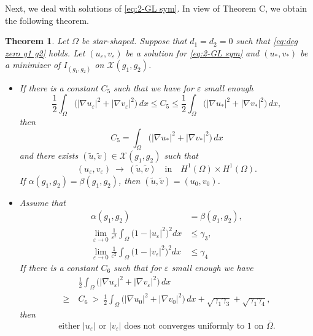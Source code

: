 \documentclass[a4paper,10pt,reqno]{amsart}
\newtheorem{theorem}{Theorem}[section]
\theoremstyle{definition}
\newcommand{\calX}{{\mathcal X}}
\newcommand{\tilu}{{\widetilde u}}
\newcommand{\tilv}{{\widetilde v}}
\newcommand{\al}{{\alpha}}
\newcommand{\ga}{{\gamma}}
\newcommand{\ve}{{\varepsilon}}
\newcommand{\Om}{{\Omega}}
\newcommand{\qin}{{\quad \mbox{in} \quad}}
\numberwithin{equation}{section}
\begin{document}
Next, we deal with solutions of \eqref{eq:2-GL sym}.
In view of Theorem C, we obtain the following theorem.

\smallskip
\begin{theorem}\label{thm:main4}
Let $\Om$ be star-shaped.
Suppose that $d_1=d_2=0$ such that  \eqref{eq:deg zero g1 g2} holds.
Let  $(u_\ve,v_\ve)$ be a solution for \eqref{eq:2-GL sym} and $(u_*,v_*)$ be a   minimizer of $I_{(g_1,g_2)}$ on $\calX(g_1,g_2)$.
\begin {itemize}
\item[{\rm (i)}]
If  there is a constant $C_5$  such that  we have for $\ve$ small enough
\begin{equation}\label{G < C_1-sys-sym}
\frac{1}{2} \int_\Omega \big( |\nabla u_\ve|^2 + |\nabla v_\ve|^2 \big)\, dx \leq C_5 \leq
\frac{1}{2} \int_\Omega \big( |\nabla u_*|^2 + |\nabla v_*|^2 \big)\, dx ,
\end{equation}
then
\begin{equation}\label{eq:C1-1-sys-sym}
C_5 = \int_\Omega \big( |\nabla u_*|^2 + |\nabla v_*|^2 \big)\, dx
\end{equation}
and there exists  $( \tilu ,\tilv)   \in \calX(g_1,g_2)$ such that
\[  (u_\ve,v_\ve)  ~\to ~  ( \tilu ,\tilv) \qin H^1(\Om)\times H^1(\Om).
\]
If $\al(g_1,g_2)=\beta(g_1,g_2)$, then $(\tilu,\tilv)=(u_0,v_0)$.


\item[{\rm (ii)}]
Assume that
\begin{align}
\label{eq:al=beta}
 \al(g_1,g_2)& =\beta(g_1,g_2) ,\\
\label{eq:gamma3}
 \lim_{\ve \to 0} \frac{1}{\ve^2} \int_\Om \big(1-|u_\ve|^2\big)^2dx  &\le \ga_3, \\
\label{eq:gamma4}
 \lim_{\ve \to 0} \frac{1}{\ve^2} \int_\Om \big(1-|v_\ve|^2\big)^2dx &  \le \ga_4
\end{align}
If there is a constant $C_6$ such that  for $\ve$ small enough we have
\begin{equation}
\label{G bdd by C1-C2-sys-sym}
\begin{aligned}
&  \frac12 \int_\Om \big( |\nabla u_\ve|^2 + |\nabla v_\ve|^2 \big)\, dx \\
\geq ~& C_6 ~> ~  \frac12 \int_\Om \big( |\nabla u_0|^2 +  |\nabla v_0|^2 \big) \, dx  + \sqrt{\ga_1\ga_3} + \sqrt{\ga_1\ga_4},
\end{aligned}
 \end{equation}
then
\[ \text{either $|u_\ve|$ or $|v_\ve|$ does not converges uniformly to 1 on $\overline\Om$.}
\]
\end{itemize}
\end{theorem}
\bigskip
\end{document}
